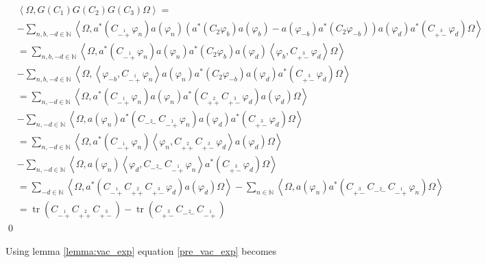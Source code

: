 \documentclass[oneside,reqno,12pt]{amsart}
\DeclareMathOperator{\tr}{tr}
\begin{document}
\begin{align*}
&\left<\Omega, G(C_1)G(C_2)G(C_3)\Omega\right>=\\
&-\sum_{n,b,-d\in\mathbb{N}} \left< \Omega, a^*\left(C_{\stackrel{1}{-+}}\varphi_n\right)a(\varphi_n) \left( a^*\left( C_2 \varphi_b\right) a(\varphi_b)-a(\varphi_{-b})a^*\left(C_2\varphi_{-b}\right)\right) a(\varphi_d)a^*\left(C_{\stackrel{3}{+-}}\varphi_d\right)\Omega\right>\\
&=\sum_{n,b,-d\in\mathbb{N}} \left<\Omega, a^*\left(C_{\stackrel{1}{-+}}\varphi_n\right) a(\varphi_n)a^*\left(C_2\varphi_b\right)a(\varphi_d)\left<\varphi_b, C_{\stackrel{3}{+-}}\varphi_d\right>\Omega\right>\\
&-\sum_{n,b,-d\in\mathbb{N}}\left<\Omega, \left<\varphi_{-b},C_{\stackrel{1}{-+}}\varphi_n\right> a(\varphi_n) a^*\left(C_2\varphi_{-b}\right)a(\varphi_d)a^*\left(C_{\stackrel{3}{+-}}\varphi_d\right)\Omega\right>\\
&=\sum_{n,-d\in\mathbb{N}}\left<\Omega, a^*\left(C_{\stackrel{1}{-+}}\varphi_n\right) a(\varphi_n) a^*\left(C_{\stackrel{2}{++}}C_{\stackrel{3}{+-}}\varphi_d\right) a(\varphi_d)\Omega\right>\\
&-\sum_{n,-d\in\mathbb{N}} \left< \Omega, a(\varphi_n) a^*\left(C_{\stackrel{2}{--}}C_{\stackrel{1}{-+}}\varphi_n\right)a(\varphi_d)a^*\left(C_{\stackrel{3}{+-}}\varphi_d\right)\Omega\right>\\
&=\sum_{n,-d\in\mathbb{N}}\left<\Omega, a^*\left(C_{\stackrel{1}{-+}}\varphi_n\right) \left<\varphi_n, C_{\stackrel{2}{++}}C_{\stackrel{3}{+-}}\varphi_d\right> a(\varphi_d)\Omega\right>\\
&-\sum_{n,-d\in\mathbb{N}} \left<\Omega, a(\varphi_n) \left< \varphi_d,C_{\stackrel{2}{--}}C_{\stackrel{1}{-+}}\varphi_n\right> a^*\left(C_{\stackrel{3}{+-}}\varphi_d\right)\Omega\right>\\
&=\sum_{-d\in\mathbb{N}}\left<\Omega, a^*\left(C_{\stackrel{1}{-+}}C_{\stackrel{2}{++}}C_{\stackrel{3}{+-}}\varphi_d\right) a(\varphi_d) \Omega\right>
-\sum_{n\in\mathbb{N}}\left<\Omega, a(\varphi_n) a^*\left(C_{\stackrel{3}{+-}}C_{\stackrel{2}{--}}C_{\stackrel{1}{-+}}\varphi_n\right)\Omega\right>\\
&=\tr\left(C_{\stackrel{1}{-+}}C_{\stackrel{2}{++}}C_{\stackrel{3}{+-}}\right)
-\tr\left( C_{\stackrel{3}{+-}}C_{\stackrel{2}{--}}C_{\stackrel{1}{-+}}\right)
\end{align*}
\qed

Using lemma \ref{lemma:vac_exp} equation \eqref{pre_vac_exp} becomes
\end{document}
